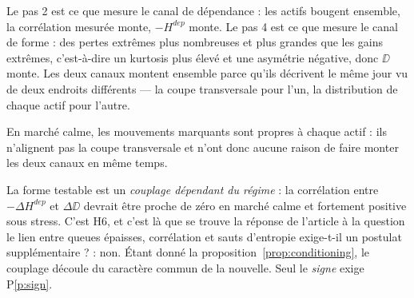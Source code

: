 Le pas 2 est ce que mesure le canal de dépendance : les actifs bougent ensemble,
la corrélation mesurée monte, $-H^{dep}$ monte. Le pas 4 est ce que mesure le
canal de forme : des pertes extrêmes plus nombreuses et plus grandes que les
gains extrêmes, c'est-à-dire un kurtosis plus élevé et une asymétrie négative,
donc $\DD$ monte. Les deux canaux montent ensemble parce qu'ils décrivent le
même jour vu de deux endroits différents --- la coupe transversale pour l'un, la
distribution de chaque actif pour l'autre.

En marché calme, les mouvements marquants sont propres à chaque actif : ils
n'alignent pas la coupe transversale et n'ont donc aucune raison de faire monter
les deux canaux en même temps.

La forme testable est un \emph{couplage dépendant du régime} : la corrélation
entre $-\Delta H^{dep}$ et $\Delta\DD$ devrait être proche de zéro en marché
calme et fortement positive sous stress. C'est H6, et c'est là que se trouve la
réponse de l'article à la question \og le lien entre queues épaisses, corrélation
et sauts d'entropie exige-t-il un postulat supplémentaire ? \fg{} : non. Étant
donné la proposition~\ref{prop:conditioning}, le couplage découle du caractère
commun de la nouvelle. Seul le \emph{signe} exige P\ref{p:sign}.

